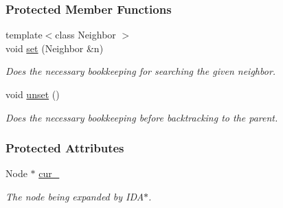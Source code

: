 \subsubsection*{Protected Member Functions}
\begin{DoxyCompactItemize}
\item 
{\footnotesize template$<$class Neighbor $>$ }\\void \hyperlink{structbacktrackLock_1_1InplaceBase_abd1d2ed285a2faee9975732c2fd70f53}{set} (Neighbor \&n)
\begin{DoxyCompactList}\small\item\em Does the necessary bookkeeping for searching the given neighbor. \end{DoxyCompactList}\item 
void \hyperlink{structbacktrackLock_1_1InplaceBase_af0f8c15cc1cec4c956c66d340515f615}{unset} ()\hypertarget{structbacktrackLock_1_1InplaceBase_af0f8c15cc1cec4c956c66d340515f615}{}\label{structbacktrackLock_1_1InplaceBase_af0f8c15cc1cec4c956c66d340515f615}

\begin{DoxyCompactList}\small\item\em Does the necessary bookkeeping before backtracking to the parent. \end{DoxyCompactList}\end{DoxyCompactItemize}
\subsubsection*{Protected Attributes}
\begin{DoxyCompactItemize}
\item 
Node $\ast$ \hyperlink{structbacktrackLock_1_1InplaceBase_a5130fa74e5e5b716fc74cd456c74ea48}{cur\+\_\+}\hypertarget{structbacktrackLock_1_1InplaceBase_a5130fa74e5e5b716fc74cd456c74ea48}{}\label{structbacktrackLock_1_1InplaceBase_a5130fa74e5e5b716fc74cd456c74ea48}

\begin{DoxyCompactList}\small\item\em The node being expanded by I\+D\+A$\ast$. \end{DoxyCompactList}\end{DoxyCompactItemize}
